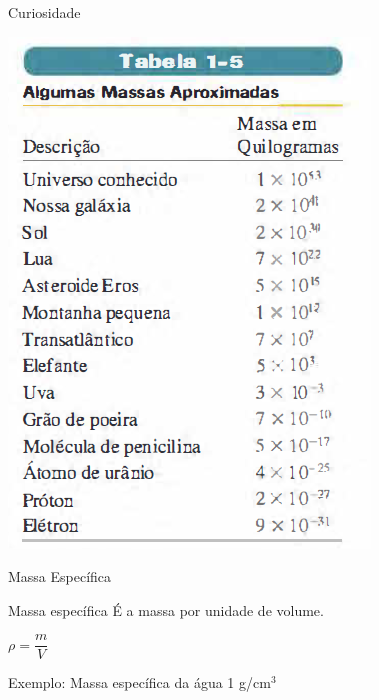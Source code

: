 \documentclass[xcolor=dvipsnames,table]{beamer}
\begin{document}
	\begin{frame}{Curiosidade}
		\begin{center}
			\includegraphics[scale=0.5]{images/tabela1-5.png}
		\end{center}
	\end{frame}	
	
	\begin{frame}{Massa Específica}
		\begin{block}{Massa específica}
			É a massa por unidade de volume.
			\begin{center}
				$\rho = \dfrac{m}{V}$
			\end{center}
		\end{block}
		\begin{block}{Exemplo: Massa específica da água}
			1 g/$\mbox{cm}^3$
		\end{block}
	\end{frame}
\end{document}
